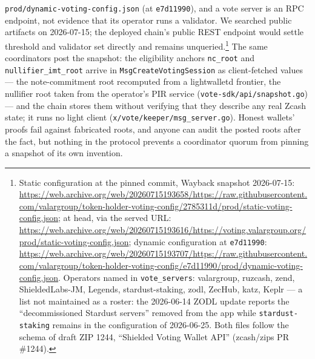 \documentclass[11pt,a4paper]{article}
\theoremstyle{definition}
\begin{document}
\texttt{prod/dynamic-voting-config.json} (at \texttt{e7d11990}), and a
vote server is an RPC endpoint, not evidence that its operator runs a
validator. We searched public artifacts on 2026-07-15; the deployed
chain's public REST endpoint would settle threshold and validator set
directly and remains unqueried.\footnote{Static configuration at the
pinned commit, Wayback snapshot 2026-07-15:
\url{https://web.archive.org/web/20260715193658/https://raw.githubusercontent.com/valargroup/token-holder-voting-config/2785311d/prod/static-voting-config.json};
at head, via the served URL:
\url{https://web.archive.org/web/20260715193616/https://voting.valargroup.org/prod/static-voting-config.json};
dynamic configuration at \texttt{e7d11990}:
\url{https://web.archive.org/web/20260715193707/https://raw.githubusercontent.com/valargroup/token-holder-voting-config/e7d11990/prod/dynamic-voting-config.json}.
Operators named in \texttt{vote\_servers}: valargroup, ruzcash, zend,
ShieldedLabs-JM, Legends, stardust-staking, zodl, ZecHub, katz, Keplr ---
a list not maintained as a roster: the 2026-06-14 ZODL update reports the
``decommissioned Stardust servers'' removed from the app while
\texttt{stardust-staking} remains in the configuration of 2026-06-25.
Both files follow the schema of draft ZIP 1244, ``Shielded Voting Wallet
API'' (zcash/zips PR \#1244).}
The same coordinators post the snapshot: the eligibility anchors
\texttt{nc\_root} and \texttt{nullifier\_imt\_root} arrive in
\texttt{MsgCreateVotingSession} as client-fetched values --- the
note-commitment root recomputed from a lightwalletd frontier, the
nullifier root taken from the operator's PIR service
(\texttt{vote-sdk/api/snapshot.go}) --- and the chain stores them without
verifying that they describe any real Zcash state; it runs no light
client (\texttt{x/vote/keeper/msg\_server.go}). Honest wallets' proofs
fail against fabricated roots, and anyone can audit the posted roots
after the fact, but nothing in the protocol prevents a coordinator quorum
from pinning a snapshot of its own invention.
\end{document}
